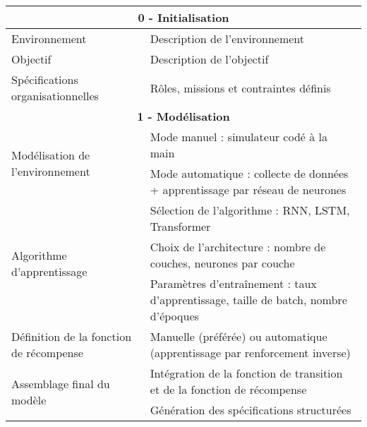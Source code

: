 \begin{table}[h!]
    \centering
    \renewcommand{\arraystretch}{1.3}
    \begin{tabular}{|l|p{10cm}|}
        \hline
        \multicolumn{2}{|c|}{\textbf{0 - Initialisation}}                                                                                     \\ \hline
        Environnement                           & Description de l'environnement                                                              \\ \hline
        Objectif                                & Description de l'objectif                                                                   \\ \hline
        Spécifications organisationnelles       & Rôles, missions et contraintes définis                                                      \\ \hline

        \multicolumn{2}{|c|}{\textbf{1 - Modélisation}}                                                                                       \\ \hline
        \multirow{2}{*}{Modélisation de l'environnement}
                                                & Mode manuel : simulateur codé à la main                                                     \\
                                                & Mode automatique : collecte de données + apprentissage par réseau de neurones               \\ \hline
        \multirow{3}{*}{Algorithme d'apprentissage}
                                                & Sélection de l'algorithme : RNN, LSTM, Transformer                                          \\
                                                & Choix de l'architecture : nombre de couches, neurones par couche                            \\
                                                & Paramètres d'entraînement : taux d'apprentissage, taille de batch, nombre d'époques         \\ \hline
        Définition de la fonction de récompense & Manuelle (préférée) ou automatique (apprentissage par renforcement inverse)                 \\ \hline
        \multirow{2}{*}{Assemblage final du modèle}
                                                & Intégration de la fonction de transition et de la fonction de récompense                    \\
                                                & Génération des spécifications structurées                                                   \\ \hline


\end{tabular}
\end{table}
